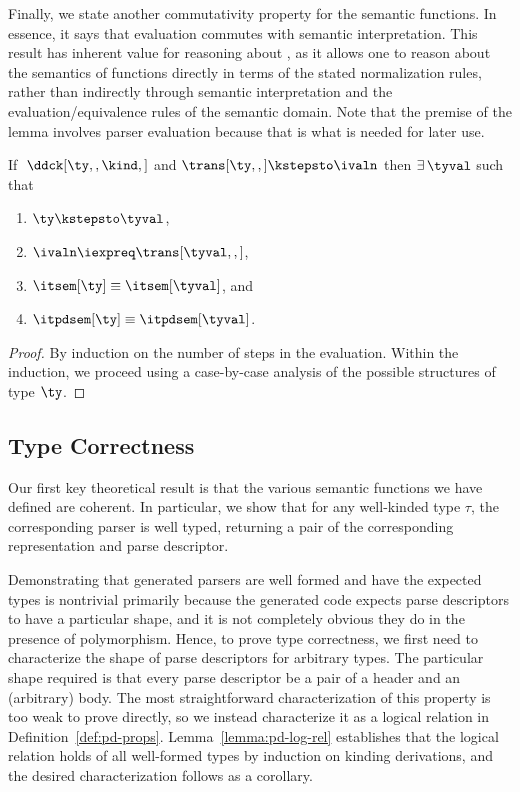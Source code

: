 Finally, we state another commutativity property for the semantic
functions. In essence, it says that evaluation
commutes with semantic interpretation. This result
has inherent value for reasoning about \ddc{}, as it allows one to
reason about the semantics of \ddc{} functions directly in terms of
the stated normalization rules, rather than indirectly through
semantic interpretation and the evaluation/equivalence rules of the
semantic domain. Note that the premise of the lemma involves parser
evaluation because that is what is needed for later use.

\begin{lemma}
  If $\; \ddck[\ty,,\kind,]$ and $\trans[\ty,,] \kstepsto \ivaln$ then
  $\exists\, \tyval$ such that
  \begin{enumerate}
  \item $\ty \kstepsto \tyval$,
  \item $\ivaln \iexpreq \trans[\tyval,,]$,
  \item $\itsem[\ty] \equiv \itsem[\tyval]$, and
  \item $\itpdsem[\ty] \equiv \itpdsem[\tyval]$.
  \end{enumerate}
\label{lemma:eval-corr}
\end{lemma}
\begin{proof}
  By induction on the number of steps in the evaluation.  Within the
  induction, we proceed using a case-by-case analysis of the possible
  structures of type $\ty$. 
\end{proof}


\subsection{Type Correctness}
Our first key theoretical result is that the various semantic
functions we have defined are coherent.  In particular, we show that
for any well-kinded \ddca{} type $\tau$, the corresponding parser is
well typed, returning a pair of the corresponding representation and
parse descriptor.

Demonstrating that generated parsers are well formed
and have the expected types is nontrivial primarily because
the generated code expects parse descriptors to have a particular shape,
and it is not completely obvious they do in the presence of polymorphism.
Hence, to prove type correctness, we first need to characterize the shape of
parse descriptors for arbitrary \ddc{} types.   
The particular shape required is that every parse descriptor be a pair
of a header and an (arbitrary) body. The most straightforward
characterization of this property is too weak to prove directly, so we
instead characterize it as a logical relation in
Definition~\ref{def:pd-props}.  Lemma~\ref{lemma:pd-log-rel}
establishes that the logical relation holds of all well-formed \ddca{}
types by induction on kinding derivations, and the desired
characterization follows as a corollary.

